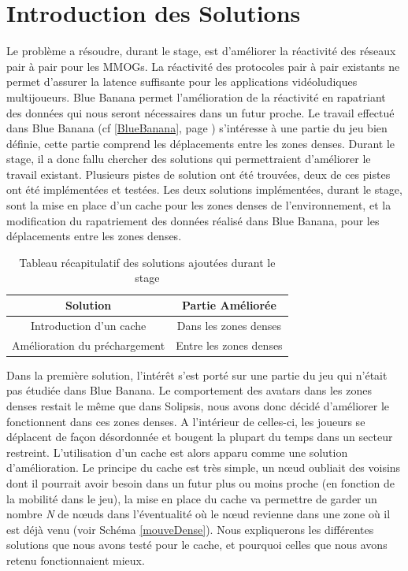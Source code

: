 \section{Introduction des Solutions}
\label{introSolutions}
	Le problème a résoudre, durant le stage, est d'améliorer la réactivité des réseaux pair à pair pour les MMOGs. La réactivité des protocoles pair à pair existants ne permet d'assurer la latence suffisante pour les applications vidéoludiques multijoueurs. Blue Banana permet l'amélioration de la réactivité en rapatriant des données qui nous seront nécessaires dans un futur proche. Le travail effectué dans Blue Banana (cf \ref{BlueBanana}, page \pageref{BlueBanana}) s'intéresse à une partie du jeu bien définie, cette partie comprend les déplacements entre les zones denses. Durant le stage, il a donc fallu chercher des solutions qui permettraient d'améliorer le travail existant. Plusieurs pistes de solution ont été trouvées, deux de ces pistes ont été implémentées et testées. Les deux solutions implémentées, durant le stage, sont la mise en place d'un cache pour les zones denses de l'environnement, et la modification du rapatriement des données réalisé dans Blue Banana, pour les déplacements entre les zones denses.
\begin{table}[!h]
  \begin{center}
    \begin{tabular}{|c|c|}
      \hline
      Solution & Partie Améliorée \\
      \hline
      Introduction d'un cache  & Dans les zones denses \\
      Amélioration du préchargement & Entre les zones denses \\
      \hline
    \end{tabular}
  \end{center}
  \label{tab:config2}
  \caption{Tableau récapitulatif des solutions ajoutées durant le stage}
\end{table}
\par Dans la première solution, l'intérêt s'est porté sur une partie du jeu qui n'était pas étudiée dans Blue Banana. Le comportement des avatars dans les zones denses restait le même que dans Solipsis, nous avons donc décidé d'améliorer le fonctionnent dans ces zones denses. A l'intérieur de celles-ci, les joueurs se déplacent de façon désordonnée et bougent la plupart du temps dans un secteur restreint. L'utilisation d'un cache est alors apparu comme une solution d'amélioration. Le principe du cache est très simple, un nœud oubliait des voisins dont il pourrait avoir besoin dans un futur plus ou moins proche (en fonction de la mobilité dans le jeu), la mise en place du cache va permettre de garder un nombre \textit{N} de nœuds dans l'éventualité où le nœud revienne dans une zone où il est déjà venu (voir Schéma \ref{mouveDense}). Nous expliquerons les différentes solutions que nous avons testé pour le cache, et pourquoi celles que nous avons retenu fonctionnaient mieux.
